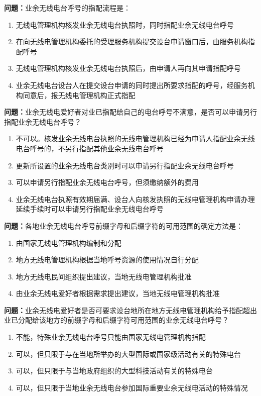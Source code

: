 \documentclass{ctexbook}
\begin{document}
\textbf{问题：}业余无线电台呼号的指配流程是：
\begin{enumerate}[label=\Alph*), leftmargin=3em]
\item 无线电管理机构核发业余无线电台执照时，同时指配业余无线电台呼号
\item 在向无线电管理机构委托的受理服务机构提交设台申请窗口后，由服务机构指配呼号
\item 无线电管理机构核发业余无线电台执照后，由申请人再向其申请指配呼号
\item 业余无线电台设台人在提交设台申请的同时提出所要求指配的呼号，经服务机构同意后，报无线电管理机构正式指配
\end{enumerate}

\textbf{问题：}业余无线电爱好者对业已指配给自己的电台呼号不满意，是否可以申请另行指配业余无线电台呼号？
\begin{enumerate}[label=\Alph*), leftmargin=3em]
\item 不可以。核发业余无线电台执照的无线电管理机构已经为申请人指配业余无线电台呼号的，不另行指配其他业余无线电台呼号
\item 更新所设置的业余无线电台类别时可以申请另行指配业余无线电台呼号
\item 可以申请另行指配业余无线电台呼号，但须缴纳额外的费用
\item 业余无线电台执照有效期届满、设台人向核发执照的无线电管理机构申请办理延续手续时可以申请另行指配业余无线电台呼号
\end{enumerate}

\textbf{问题：}各地业余无线电台呼号前缀字母和后缀字符的可用范围的确定方法是：
\begin{enumerate}[label=\Alph*), leftmargin=3em]
\item 由国家无线电管理机构编制和分配
\item 地方无线电管理机构根据当地呼号资源的使用情况自行分配
\item 地方无线电民间组织提出建议，当地无线电管理机构批准
\item 由业余无线电爱好者根据需求提出建议，当地无线电管理机构批准
\end{enumerate}

\textbf{问题：}业余无线电爱好者是否可要求设台地所在地方无线电管理机构给予指配超出业已分配给该地方的前缀字母和后缀字符可用范围的业余无线电台呼号？
\begin{enumerate}[label=\Alph*), leftmargin=3em]
\item 不能，特殊业余无线电台呼号只能由国家无线电管理机构指配
\item 可以，但只限于与在当地所举办的大型国际或国家级活动有关的特殊电台
\item 可以，但只限于与当地政府组织的大型科技活动有关的特殊电台
\item 可以，但只限于当地业余无线电台参加国际重要业余无线电活动的特殊情况
\end{enumerate}
\end{document}
